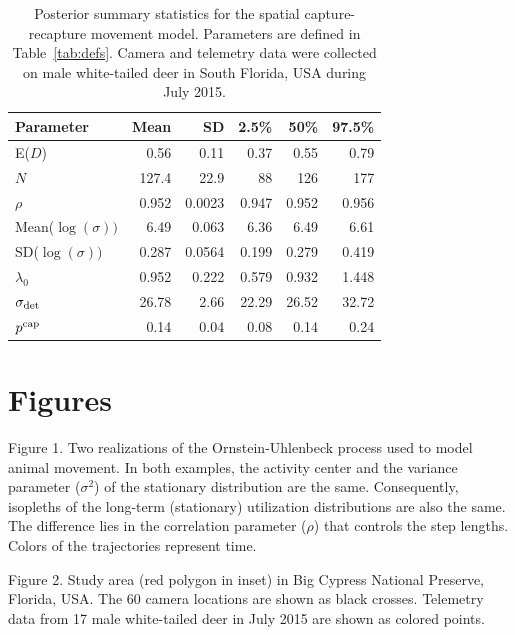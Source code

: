 \documentclass[12pt]{article}
\begin{document}
\begin{table}[h!]
  \centering
  \caption{Posterior summary statistics for the spatial
    capture-recapture movement model. Parameters are defined in Table~\ref{tab:defs}.
    Camera and telemetry data were collected on male white-tailed deer
    in South Florida, USA during July 2015.}
  \vspace{6pt}
  \begin{tabular}{lrrrrr}
    \hline
    Parameter            & Mean   & SD     & 2.5\%  & 50\%   & 97.5\% \\
    \hline
    E($D$)               & 0.56   & 0.11   & 0.37   & 0.55   & 0.79   \\ 
    $N$                  & 127.4  & 22.9   & 88     & 126    & 177    \\ 
    $\rho$               & 0.952  & 0.0023 & 0.947  & 0.952  & 0.956  \\ 
    Mean($\log(\sigma))$ & 6.49   & 0.063  & 6.36   & 6.49   & 6.61   \\ 
    SD($\log(\sigma))$   & 0.287  & 0.0564 & 0.199  & 0.279  & 0.419  \\ 
    $\lambda_0$          & 0.952  & 0.222  & 0.579  & 0.932  & 1.448  \\ 
    $\sigma_{\rm det}$   & 26.78  & 2.66   & 22.29  & 26.52  & 32.72  \\ 
    $p^{\rm cap}$        & 0.14 & 0.04 & 0.08 & 0.14 & 0.24 \\ 
    \hline
  \end{tabular}
  \label{tab:post}
\end{table}


\clearpage

\section*{Figures}

\vspace{12pt}

Figure 1. Two realizations of the Ornstein-Uhlenbeck process used to
    model animal movement. In both examples, the activity center and
    the variance parameter ($\sigma^2$) of the stationary distribution
    are the same. Consequently, isopleths of the long-term
    (stationary) utilization distributions are also the same. The
    difference lies in the correlation parameter ($\rho$) that
    controls the step lengths. Colors of the trajectories represent
    time.

Figure 2. Study area (red polygon in inset) in Big Cypress National Preserve, 
    Florida, USA. The 60 camera locations are shown as black
    crosses. Telemetry data from 17 male white-tailed deer in July
    2015 are shown as colored points.    
\end{document}
